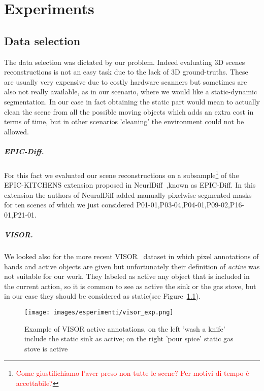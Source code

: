 \chapter{Experiments}
\section{Data selection}
The data selection was dictated by our problem. Indeed evaluating 3D scenes 
reconstructions is not an easy task due to the lack of 3D ground-truths. These
are usually very expensive due to costly hardware scanners but sometimes are 
also not really available, as in our scenario, where we would like a static-dynamic
segmentation. In our case in fact obtaining the static part would mean to 
actually clean the scene from all the possible moving objects which adds 
an extra cost in terms of time, but in other scenarios 'cleaning' the environment
could not be allowed.

\paragraph{EPIC-Diff.}For this fact we evaluated our scene reconstructions on a subsample\footnote{\textcolor{red}{Come giustifichiamo l'aver preso non tutte le scene? Per motivi di tempo è accettabile?}}
of the EPIC-KITCHENS extension proposed in NeurlDiff~\cite{neuraldiff},known as EPIC-Diff. In this extension
the authors of NeuralDiff added manually pixelwise segmented masks for ten scenes of which we just considered 
P01-01,P03-04,P04-01,P09-02,P16-01,P21-01.

\paragraph{VISOR.}We looked also for 
the more recent VISOR~\cite{visor} dataset in which pixel annotations of hands 
and active objects are given but unfortunately their definition of \textit{active}
was not suitable for our work. They labeled as active any object that is 
included in the current action, so it is common to see as active the sink or 
the gas stove, but in our case they should be considered as static(see Figure~\ref{fig:vis_exp}).

\begin{figure}[H]
    \centering
    \texttt{[image: images/esperimenti/visor\_exp.png]} 
    \caption{Example of VISOR active annotations, on the left 'wash a knife' include the
    static sink as active; on the right 'pour spice' static gas stove is active}\label{fig:vis_exp}
\end{figure}

